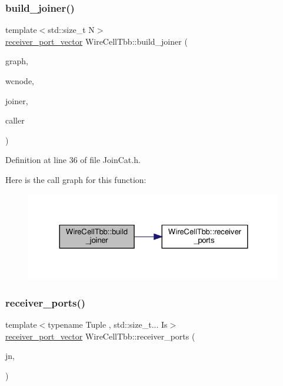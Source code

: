 \subsubsection{\texorpdfstring{build\+\_\+joiner()}{build\_joiner()}}
{\footnotesize\ttfamily template$<$std\+::size\+\_\+t N$>$ \\
\hyperlink{namespace_wire_cell_tbb_a87f42fe8a3ccc3bf9d315cb2d252c7af}{receiver\+\_\+port\+\_\+vector} Wire\+Cell\+Tbb\+::build\+\_\+joiner (\begin{DoxyParamCaption}\item[{tbb\+::flow\+::graph \&}]{graph,  }\item[{\hyperlink{class_wire_cell_1_1_interface_a09c548fb8266cfa39afb2e74a4615c37}{Wire\+Cell\+::\+I\+Node\+::pointer}}]{wcnode,  }\item[{tbb\+::flow\+::graph\+\_\+node $\ast$\&}]{joiner,  }\item[{tbb\+::flow\+::graph\+\_\+node $\ast$\&}]{caller }\end{DoxyParamCaption})}



Definition at line 36 of file Join\+Cat.\+h.

Here is the call graph for this function\+:
\nopagebreak
\begin{figure}[H]
\begin{center}
\leavevmode
\includegraphics[width=324pt]{namespace_wire_cell_tbb_ab99dbcf9cc9065475d9b911ace3dd2b2_cgraph}
\end{center}
\end{figure}
\mbox{\label{namespace_wire_cell_tbb_a6ecb68802302619dd9900975162a0354}} 
\subsubsection{\texorpdfstring{receiver\+\_\+ports()}{receiver\_ports()}\hspace{0.1cm}{\footnotesize\ttfamily [1/2]}}
{\footnotesize\ttfamily template$<$typename Tuple , std\+::size\+\_\+t... Is$>$ \\
\hyperlink{namespace_wire_cell_tbb_a87f42fe8a3ccc3bf9d315cb2d252c7af}{receiver\+\_\+port\+\_\+vector} Wire\+Cell\+Tbb\+::receiver\+\_\+ports (\begin{DoxyParamCaption}\item[{tbb\+::flow\+::join\+\_\+node$<$ Tuple $>$ \&}]{jn,  }\item[{\hyperlink{structstd_1_1index__sequence}{std\+::index\+\_\+sequence}$<$ Is... $>$}]{ }\end{DoxyParamCaption})}



